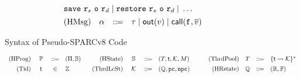 \begin{figure*}[!t]
\[\begin{array}{rcclcrccl}
            \multicolumn{6}{l}
            {
                \csave{} \ \reg{s} \ \oexp \ \reg{d} \sepline 
                \crestore{} \ \reg{s} \ \oexp \ \reg{d} \sepline
                \dots
            } 
            \\
            \\[-8pt]
            \TYPE{(HMsg)} & \hmsg & \define & \empmsg \sepline \outEvt{\val} \sepline 
            \callEvt{\lab{}, \args{\val}} 
        \end{array}
    \]
    \vspace{-1em}
    \caption{Syntax of Pseudo-SPARCv8 Code}
    \label{fig:syntax-of-concur-pseudo-sparc}
    \vspace{-1em}
\end{figure*}
\begin{figure*}[!t]
    \centering
    \small
    \[
        \begin{array}{rcclrcclrccl}
            \TYPE{(HProg)} & \ \HProg \ & \define & 
            (\HMd, \hpstate) & 
            \qquad
            \TYPE{(HState)} & \ \hpstate \ & \define & 
            (\thrdpool, \thrdid, \hthrdlocalst, \Mem) & 
            \qquad
            \TYPE{(ThrdPool)} & \thrdpool & \define & 
            \{ \thrdid \rightsquigarrow \hthrdlocalst \}^{*} 
            \\
            \\[-8pt]
            \TYPE{(Tid)} & \thrdid & \in & \Ztype & 
            \TYPE{(ThrdLcSt)} & \ \hthrdlocalst \ & \define & 
            (\hRstate, \pc, \npc) & 
            \TYPE{(HRstate)} & \hRstate & \define & 
            (\hRfile, \hWstk) \\
            \\


\end{array}\]
\end{figure*}
